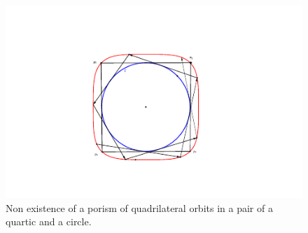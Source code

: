 \begin{exercise}
\begin{figure}
    \centering
     \includegraphics[scale=1]{pics_tex/periodo4_darboux_Q4_C2.pdf}
    \caption{Non existence of a porism of quadrilateral orbits in a pair of a quartic and a circle.}
    \label{fig:period4darboux}
\end{figure}

\end{exercise}


\begin{exercise}\label{ex:23} 

\end{exercise}


\begin{exercise}\label{ex:24}

\end{exercise}